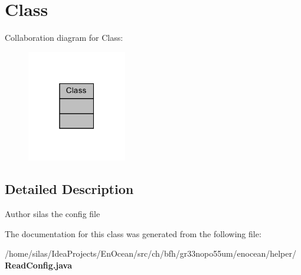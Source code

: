 \section{Class}
\label{classClass}


Collaboration diagram for Class\+:\nopagebreak
\begin{figure}[H]
\begin{center}
\leavevmode
\includegraphics[width=123pt]{d2/d45/classClass__coll__graph}
\end{center}
\end{figure}


\subsection{Detailed Description}
\begin{DoxyAuthor}{Author}
silas the config file 
\end{DoxyAuthor}


The documentation for this class was generated from the following file\+:\begin{DoxyCompactItemize}
\item 
/home/silas/\+Idea\+Projects/\+En\+Ocean/src/ch/bfh/gr33nopo55um/enocean/helper/{\bf Read\+Config.\+java}\end{DoxyCompactItemize}
